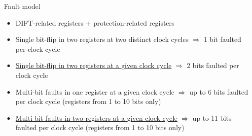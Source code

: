 \begin{frame}{Fault model}
    \begin{block}{}
        \begin{itemize}
            \item DIFT-related registers + protection-related registers
            \item Single bit-flip in two registers at two distinct clock cycles {\footnotesize$\Rightarrow$ 1 bit faulted per clock cycle}
            \item \underline{Single bit-flip in two registers at a given clock cycle} {\footnotesize$\Rightarrow$ 2 bits faulted per clock cycle}
            \item Multi-bit faults in one register at a given clock cycle {\footnotesize$\Rightarrow$ up to 6 bits faulted per clock cycle} {\tiny (registers from 1 to 10 bits only)}
            \item \underline{Multi-bit faults in two registers at a given clock cycle} {\footnotesize$\Rightarrow$ up to 11 bits faulted per clock cycle} {\tiny (registers from 1 to 10 bits only)}
        \end{itemize}
    \end{block}
\end{frame}
